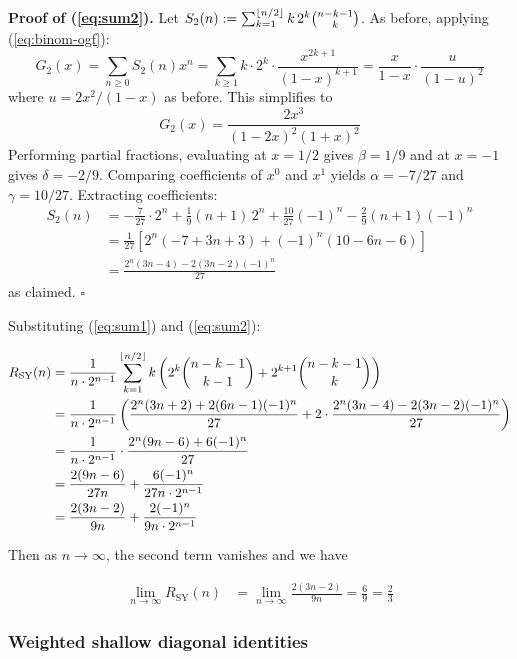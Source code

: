 \documentclass[11pt]{article}
\DeclarePairedDelimiter\floor{\lfloor}{\rfloor}
\begin{document}
\textbf{Proof of (\ref{eq:sum2}).} Let $S_2(n) := \sum_{k=1}^{\floor{n/2}} k\, 2^k \binom{n-k-1}{k}$. As before, applying (\ref{eq:binom-ogf}):
\[
G_2(x) = \sum_{n \ge 0} S_2(n) x^n = \sum_{k \ge 1} k \cdot 2^k \cdot \frac{x^{2k+1}}{(1-x)^{k+1}} = \frac{x}{1-x} \cdot \frac{u}{(1-u)^2}
\]
where $u = 2x^2/(1-x)$ as before. This simplifies to
\[
G_2(x) = \frac{2x^3}{(1-2x)^2(1+x)^2}
\]
Performing partial fractions, evaluating at $x = 1/2$ gives $\beta = 1/9$ and at $x = -1$ gives $\delta = -2/9$. Comparing coefficients of $x^0$ and $x^1$ yields $\alpha = -7/27$ and $\gamma = 10/27$. Extracting coefficients:
\begin{align*}
S_2(n) &= -\frac{7}{27}\cdot 2^n + \frac{1}{9}(n+1)\,2^n + \frac{10}{27}(-1)^n - \frac{2}{9}(n+1)(-1)^n \\
&= \frac{1}{27}\left[2^n(-7+3n+3) + (-1)^n(10-6n-6)\right] \\
&= \frac{2^n(3n-4) - 2(3n-2)(-1)^n}{27}
\end{align*}
as claimed. $\square$

Substituting (\ref{eq:sum1}) and (\ref{eq:sum2}):

\begin{align}
 R_{\text{SY}}(n) &= \frac{1}{n \cdot 2^{n-1}}\sum_{k=1}^{\floor{n/2}} k \left( 2^k \binom{n-k-1}{k-1} + 2^{k+1} \binom{n-k-1}{k} \right) \\
 &= \frac{1}{n \cdot 2^{n-1}} \left(\frac{2^n (3n+2) + 2(6n-1)(-1)^n}{27}  + 2 \cdot \frac{2^n (3n-4)-2(3n-2)(-1)^n}{27} \right) \\
 &= \frac{1}{n \cdot 2^{n-1}} \cdot \frac{2^n(9n-6) + 6(-1)^n}{27} \\
 &= \frac{2(9n-6)}{27n} + \frac{6(-1)^n}{27n \cdot 2^{n-1}} \\
 &= \frac{2(3n-2)}{9n} + \frac{2(-1)^n}{9n \cdot 2^{n-1}}
\end{align}

Then as $n \rightarrow \infty$, the second term vanishes and we have

\begin{align}
    \lim_{n \rightarrow \infty} R_{\text{SY}}(n) &= \lim_{n \rightarrow \infty} \frac{2(3n-2)}{9n} = \frac{6}{9} = \frac{2}{3}
\end{align}

\subsubsection{Weighted shallow diagonal identities}
\end{document}
